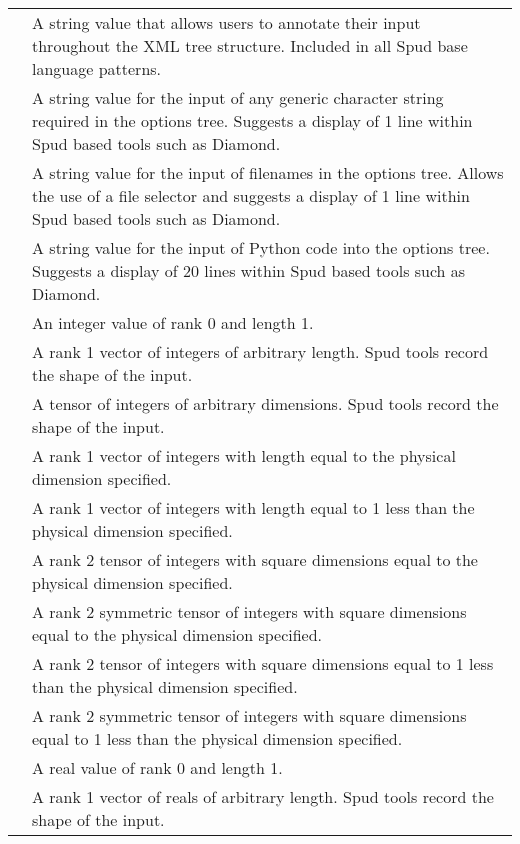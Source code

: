 \documentclass[a4paper, 11pt]{book}
\begin{document}
\noindent\begin{longtable}{lp{8cm}}
\lstinline*comment* & A string value that allows users to annotate their input throughout the XML tree structure.  Included in all Spud base language patterns. \\
\lstinline*anystring* & A string value for the input of any generic character string required in the options tree.  Suggests a display of 1 line within Spud based tools such as Diamond. \\
\lstinline*filename* & A string value for the input of filenames in the options tree.  Allows the use of a file selector and suggests a display of 1 line within Spud based tools such as Diamond. \\
\lstinline*Python_code* & A string value for the input of Python code into the options tree.  Suggests a display of 20 lines within Spud based tools such as Diamond. \\
\lstinline*integer* & An integer value of rank 0 and length 1. \\
\lstinline*integer_vector* & A rank 1 vector of integers of arbitrary length.  Spud tools record the shape of the input. \\
\lstinline*integer_tensor* & A tensor of integers of arbitrary dimensions.  Spud tools record the shape of the input. \\
\lstinline*integer_dim_vector* & A rank 1 vector of integers with length equal to the physical dimension specified. \\
\lstinline*integer_dim_minus_one_vector* & A rank 1 vector of integers with length equal to 1 less than the physical dimension specified. \\
\lstinline*integer_dim_tensor* & A rank 2 tensor of integers with square dimensions equal to the physical dimension specified. \\
\lstinline*integer_dim_symmetric_tensor* & A rank 2 symmetric tensor of integers with square dimensions equal to the physical dimension specified. \\
\lstinline*integer_dim_minus_one_tensor* & A rank 2 tensor of integers with square dimensions equal to 1 less than the physical dimension specified. \\
\lstinline*integer_dim_minus_one_symmetric_tensor* & A rank 2 symmetric tensor of integers with square dimensions equal to 1 less than the physical dimension specified. \\
\lstinline*real* & A real value of rank 0 and length 1. \\
\lstinline*real_vector* & A rank 1 vector of reals of arbitrary length.  Spud tools record the shape of the input. \\

\end{longtable}
\end{document}
